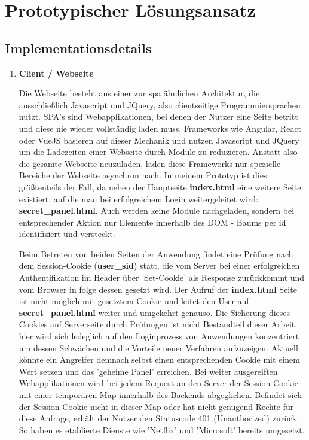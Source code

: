 \chapter{Prototypischer Lösungsansatz}

\section{Implementationsdetails}
\begin{enumerate} 
\item \textbf{Client / Webseite}

Die Webseite besteht aus einer zur \ac{spa} ähnlichen Architektur, die ausschließlich Javascript und JQuery, also clientseitige Programmiersprachen nutzt. SPA's sind Webapplikationen, bei denen der Nutzer eine Seite betritt und diese nie wieder vollständig laden muss. Frameworks wie Angular, React oder VueJS basieren auf dieser Mechanik und nutzen Javascript und JQuery um die Ladezeiten einer Webseite durch Module zu reduzieren. Anstatt also die gesamte Webseite neuzuladen, laden diese Frameworks nur spezielle Bereiche der Webseite asynchron nach. In meinem Prototyp ist dies größtenteils der Fall, da neben der Hauptseite \textbf{index.html} eine weitere Seite existiert, auf die man bei erfolgreichem Login weitergeleitet wird: \textbf{secret\_panel.html}. Auch werden keine Module nachgeladen, sondern bei entsprechender Aktion nur Elemente innerhalb des DOM - Baums per id identifiziert und versteckt.

Beim Betreten von beiden Seiten der Anwendung findet eine Prüfung nach dem Session-Cookie (\textbf{user\_sid}) statt, die vom Server bei einer erfolgreichen Authentifikation im Header über 'Set-Cookie' als Response zurückkommt und vom Browser in folge dessen gesetzt wird. Der Aufruf der \textbf{index.html} Seite ist nicht möglich mit gesetztem Cookie und leitet den User auf \textbf{secret\_panel.html} weiter und umgekehrt genauso. Die Sicherung dieses Cookies auf Serverseite durch Prüfungen ist nicht Bestandteil dieser Arbeit, hier wird sich ledeglich auf den Loginprozess von Anwendungen konzentriert um dessen Schwächen und die Vorteile neuer Verfahren aufzuzeigen. Aktuell könnte ein Angreifer demnach selbst einen entsprechenden Cookie mit einem Wert setzen und das 'geheime Panel' erreichen. Bei weiter ausgereiften Webapplikationen wird bei jedem Request an den Server der Session Cookie mit einer temporären Map innerhalb des Backends abgeglichen. Befindet sich der Session Cookie nicht in dieser Map oder hat nicht genügend Rechte für diese Anfrage, erhält der Nutzer den Statuscode 401 (Unauthorized) zurück. So haben es etablierte Dienste wie 'Netflix' und 'Microsoft' bereits umgesetzt.


\end{enumerate}
